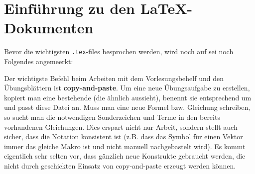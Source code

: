 \chapter{Einf\"{u}hrung zu den \LaTeX-Dokumenten}

Bevor die wichtigsten {\tt .tex}-files besprochen werden, wird noch auf sei noch
Folgendes angemeerkt:

Der wichtigste Befehl beim Arbeiten mit dem Vorlesungsbehelf und den
Übungsblättern ist {\bf copy-and-paste}. Um eine neue Übungsaufgabe zu
erstellen, kopiert man eine bestehende (die ähnlich aussieht), benennt sie
entsprechend um und passt diese Datei an. Muss man eine neue Formel bzw.
Gleichung schreiben, so sucht man die notwendigen Sonderzeichen und Terme in
den bereits vorhandenen Gleichungen. Dies erspart nicht nur Arbeit, sondern
stellt auch sicher, dass die Notation konsistent ist (z.B. dass das Symbol für
einen Vektor immer das gleiche Makro ist und nicht manuell nachgebastelt wird). 
Es kommt eigentlich sehr selten vor, dass gänzlich neue Konstrukte gebraucht
werden, die nicht durch geschickten Einsatz von copy-and-paste erzeugt werden
können.\newline

\begin{comment}
    Es wird ein gewisses Grundwissen in \LaTeX{} vorausgesetzt; man muss
    beileibe kein Experte sein, aber man sollte die basics bereits beherrschen.
    Ziel des vorliegenden Kapitels ist es, die Handhabung der 
    einzelnen {\tt .tex}-Dokumente des Vorlesungsbehelfs und der Übungsblätter
    zu skizzieren, nicht aber die Verwendung von \LaTeX{} von Grund auf zu 
    erklären. Sollte die Leserin bzw. der Leser noch keine Erfahrungen darin 
    haben, so sei auf die Tutorials der TU Graz verwiesen:
    \url{\latextugraz}\newline
    Die Verwendung von \LaTeX{} ist für die meisten Anwendung ohnehin relativ
    einfach. Außerdem müssen viele Bachelor-/Masterprojekte und Masterarbeiten
    zwingend in \LaTeX{} verfasst werden. Zumal \LaTeX{}, sobald es beherrscht
    wird, sowieso jedwede herkömmliche Software zur Textverarbeitung schlägt,
    sollte das Erlernen von \LaTeX{} nicht als Zeitverschwendung, sondern als 
    Aneignung einer nützlichen Zusatzqualifikation angesehen werden.
\end{comment}
\begin{comment}
    Ähnliches gilt beim Arbeiten mit {\tt Corel-Draw}: Muss ein neues Bild
    erstellt werden, so kopiert man sich am besten die Pfeile, Blöcke, Federn
    und sonstige Symbole aus bestehenden Bildern zusammen.
\end{comment}

